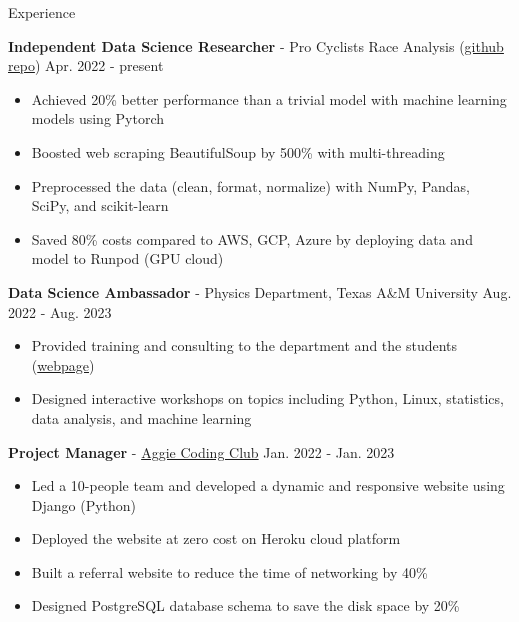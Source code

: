 \documentclass{resume}
\begin{document}
\vspace{-0.25em}
\begin{rSection}{Experience}
    \vspace{-1.5em}
    \item \textbf{Independent Data Science Researcher} - {Pro Cyclists Race Analysis} (\href{https://github.com/noctildon/pro_cyclists}{github repo}) \hfill Apr. 2022 - present
        \begin{itemize}
        \item Achieved 20\% better performance than a trivial model with machine learning models using Pytorch
        \item Boosted web scraping BeautifulSoup by 500\% with multi-threading
        \item Preprocessed the data (clean, format, normalize) with NumPy, Pandas, SciPy, and scikit-learn
        \item Saved 80\% costs compared to AWS, GCP, Azure by deploying data and model to Runpod (GPU cloud)
        \end{itemize}

    \item \textbf{Data Science Ambassador} - Physics Department, Texas A\&M University \hfill Aug. 2022 - Aug. 2023
        \begin{itemize}
        \item Provided training and consulting to the department and the students (\href{https://noctildon.github.io/DS_ambassador/index.html}{webpage})
        \item Designed interactive workshops on topics including Python, Linux, statistics, data analysis, and machine learning
        \end{itemize}

    \item \textbf{Project Manager} - \href{https://aggiecodingclub.com}{Aggie Coding Club} \hfill Jan. 2022 - Jan. 2023
        \begin{itemize}
        \item Led a 10-people team and developed a dynamic and responsive website using Django (Python)
        \item Deployed the website at zero cost on Heroku cloud platform
        \item Built a referral website to reduce the time of networking by 40\%
        \item Designed PostgreSQL database schema to save the disk space by 20\%
        \end{itemize}


\end{rSection}
\end{document}
